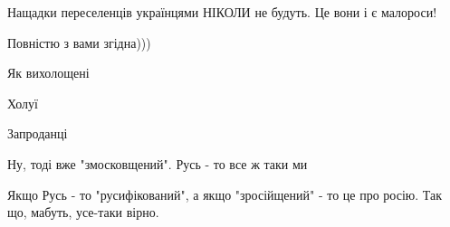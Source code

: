 \begin{itemize}
Нащадки переселенців українцями НІКОЛИ не будуть. Це вони і є малороси!

 
Повністю з вами згідна)))

 
Як вихолощені

 
Холуї

 
Запроданці

 
Ну, тоді вже "змосковщений". Русь - то все ж таки ми

\begin{itemize}
 
Якщо Русь - то "русифікований", а якщо "зросійщений" - то це про росію. Так що, мабуть, усе-таки вірно.


 

\end{itemize}
\end{itemize}
